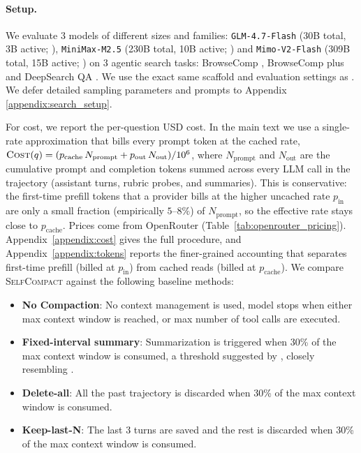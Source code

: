 \documentclass{article}
\newcommand{\jack}[1]{{\color{green}[JZ: #1]}}
\newcommand{\method}{\textsc{{SelfCompact}}}
\begin{document}

\paragraph{Setup.}

We evaluate 3 models of different sizes and families: \texttt{GLM-4.7-Flash} (30B total, 3B active; \citep{5team2025glm45agenticreasoningcoding}), \texttt{MiniMax-M2.5} (230B total, 10B active; \citep{minimax2026m25}) and \texttt{Mimo-V2-Flash} (309B total, 15B active; \citep{coreteam2026mimov2flashtechnicalreport}) on 3 agentic search tasks: BrowseComp \citep{wei2025browsecompsimplechallengingbenchmark} , BrowseComp plus \citep{chen2025BrowseCompPlus} and DeepSearch QA \citep{gupta2026deepsearchqabridgingcomprehensivenessgap}. We use the exact same scaffold and evaluation settings as \citet{lee2026agenticaggregationparallelscaling}. We defer detailed sampling parameters and prompts to Appendix \ref{appendix:search_setup}.

For cost, we report the per-question USD cost. In the main text we use a
single-rate approximation that bills every prompt token at the cached
rate,
$\textsc{Cost}(q) = (p_{\text{cache}}\,N_{\text{prompt}} + p_{\text{out}}\,N_{\text{out}})/10^6$,
where $N_{\text{prompt}}$ and $N_{\text{out}}$ are the cumulative prompt
and completion tokens summed across every LLM call in the trajectory
(assistant turns, rubric probes, and summaries). This is conservative:
the first-time prefill tokens that a provider bills at the higher
uncached rate $p_{\text{in}}$ are only a small fraction (empirically
$5$--$8\%$) of $N_{\text{prompt}}$, so the effective rate stays close to
$p_{\text{cache}}$. Prices come from OpenRouter
(Table~\ref{tab:openrouter_pricing}). Appendix~\ref{appendix:cost} gives
the full procedure, and Appendix~\ref{appendix:tokens} reports the
finer-grained accounting that separates first-time prefill (billed at
$p_{\text{in}}$) from cached reads (billed at $p_{\text{cache}}$).
We compare \method{} against the following baseline methods:

\begin{itemize}[leftmargin=*]
    \item \textbf{No Compaction}: No context management is used, model stops when either max context window is reached, or max number of tool calls are executed.
    \item  \textbf{Fixed-interval summary}: Summarization is triggered when 30\% of the max context window is consumed, a threshold suggested by \citet{liu2025webexplorer}, closely resembling \citet{wu2026reasoningcachecontinualimprovement}. 
    \item \textbf{Delete-all}: All the past trajectory is discarded when 30\% of the max context window is consumed.
    \item \textbf{Keep-last-N}: The last 3 turns are saved and the rest is discarded when 30\% of the max context window is consumed.
\end{itemize}
\end{document}
